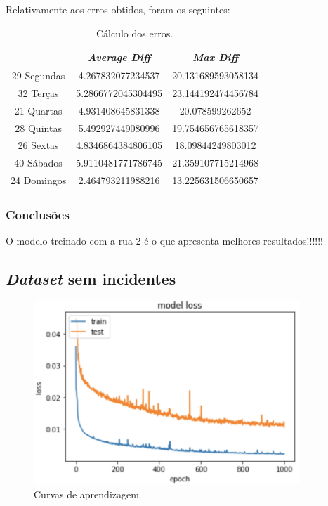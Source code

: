 \documentclass[a4paper, 12pt]{article}
\begin{document}
Relativamente aos erros obtidos, foram os seguintes:

\begin{table}[H]
	\centering
	\begin{tabular}{||c||c|c||}
		\hline\hline
		& \textit{Average Diff} & \textit{Max Diff} \\
		\hline\hline
		29 Segundas & 
4.267832077234537
 & 20.131689593058134\\
		\hline
		32 Terças  &
5.2866772045304495
 & 23.144192474456784 \\
		\hline
		21 Quartas & 
4.931408645831338
 & 20.078599262652 \\
		\hline
		28 Quintas  & 5.492927449080996

 & 19.754656765618357\\
		\hline
		26 Sextas & 
4.8346864384806105 & 18.09844249803012 \\
		\hline
		40 Sábados  & 5.9110481771786745
& 21.359107715214968 \\
		\hline
		24 Domingos & 
2.464793211988216
 & 13.225631506650657
 \\
		\hline\hline
	\end{tabular}
	\label{table:mod4_rua3}
	\caption{Cálculo dos erros.}
\end{table}

\subsubsection{Conclusões}

O modelo treinado com a rua 2 é o que apresenta melhores resultados!!!!!!

\subsection{\textit{Dataset} sem incidentes}

\begin{figure}[H]
	\centering
	\includegraphics[width=10cm]{resultados/aprend_no_inc.png}
	\caption{Curvas de aprendizagem.}
\end{figure}
\end{document}
